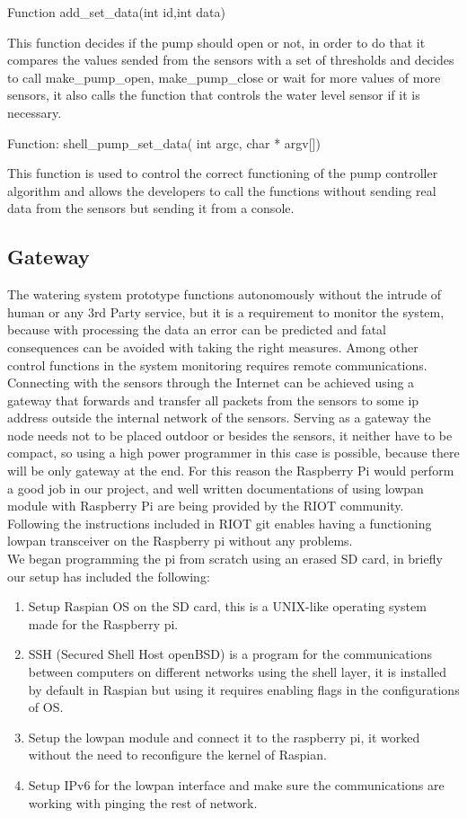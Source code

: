 \documentclass[11pt,paper=a4,parskip=half]{scrartcl}
\begin{document}
Function add\_set\_data(int id,int data)

This function decides if the pump should open or not, in order to do that it compares the values sended from the sensors with a set of thresholds and decides to call make\_pump\_open, make\_pump\_close or wait for more values of more sensors, it also calls the function that controls the water level sensor if it is necessary.

Function: shell\_pump\_set\_data( int argc, char * argv[])

This function is used to control the correct functioning of the pump controller algorithm and allows the developers to call the functions without sending real data from the sensors but sending it from a console.
\subsection{Gateway}  

The watering system prototype functions autonomously without the intrude of human or any 3rd Party service, but it is a requirement to monitor the system, because with processing the data an error can be predicted and fatal consequences can be avoided with taking the right measures. Among other control functions in the system monitoring requires remote communications.
Connecting with the sensors through the Internet can be achieved using a gateway that forwards and transfer all packets from the sensors to some ip address outside the internal network of the sensors. Serving as a gateway  the node needs not to be placed outdoor or besides the sensors, it neither have to be compact, so using a high power programmer in this case is possible, because there will be only gateway at the end. For this reason the Raspberry Pi would perform a good job in our project, and well written documentations of using lowpan module with Raspberry Pi are being provided by the RIOT community. Following the instructions included in RIOT git \cite{lowpan} enables having a functioning lowpan transceiver on the Raspberry pi without any problems. \\
We began programming the pi from scratch using an erased SD card, in briefly our setup has included the following:
\begin{enumerate}
	\item Setup Raspian OS on the SD card, this is a UNIX-like operating system made for the Raspberry pi.
	\item SSH (Secured Shell Host  openBSD) is a program for the communications between computers on different networks using the shell layer, it is installed by default in Raspian but using it requires enabling flags in the configurations of OS.
	\item Setup the lowpan module and connect it to the raspberry pi, it worked without the need to reconfigure the kernel of Raspian. 
	\item Setup IPv6 for the lowpan interface and make sure the communications are working with pinging the rest of network.
\end{enumerate}
\end{document}
